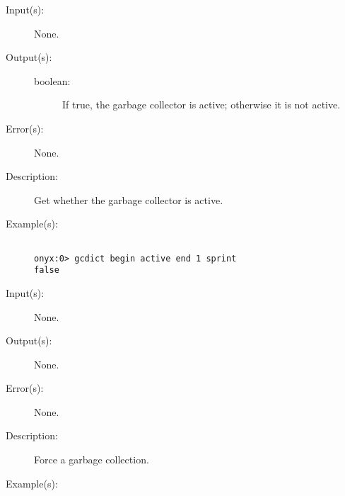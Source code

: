 \begin{description}
\label{gcdict:active}
\item[{\onyxop{--}{active}{boolean}}: ]
	\begin{description}\item[]
	\item[Input(s): ] None.
	\item[Output(s): ]
		\begin{description}\item[]
		\item[boolean: ]
			If true, the garbage collector is active; otherwise it
			is not active.
		\end{description}
	\item[Error(s): ] None.
	\item[Description: ]
		Get whether the garbage collector is active.
	\item[Example(s): ]\begin{verbatim}

onyx:0> gcdict begin active end 1 sprint
false
		\end{verbatim}
	\end{description}
\label{gcdict:collect}
\item[{\onyxop{--}{collect}{--}}: ]
	\begin{description}\item[]
	\item[Input(s): ] None.
	\item[Output(s): ] None.
	\item[Error(s): ] None.
	\item[Description: ]
		Force a garbage collection.
	\item[Example(s): ]\begin{verbatim}


\end{verbatim}
\end{description}
\end{description}
